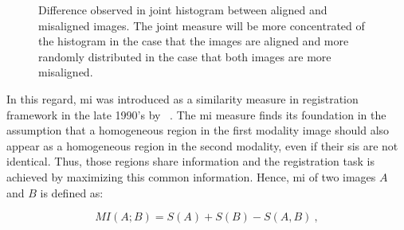 \begin{enumerate}[leftmargin=*]
\begin{figure}
  \centering
  \hspace*{\fill}
  \hfill
  \hspace*{\fill}
  \caption[Difference observed in joint histogram between aligned and
  misaligned images.]{Difference observed in joint histogram between aligned
    and misaligned images. The joint measure will be more concentrated of the
    histogram in the case that the images are aligned and more randomly
    distributed in the case that both images are more misaligned.}
  \label{fig:jointhisto}
\end{figure}

In this regard, \ac{mi} was introduced as a similarity measure in registration
framework in the late 1990's by \citeauthor{Pluim2003}~\cite{Pluim2003}.
The \ac{mi} measure finds its foundation in the assumption that a homogeneous
region in the first modality image should also appear as a homogeneous region
in the second modality, even if their \acp{si} are not identical.
Thus, those regions share information and the registration task is achieved by
maximizing this common information.
Hence, \Ac{mi} of two images $A$ and $B$ is defined as:

\begin{equation}
  MI(A;B) = S(A) + S(B) - S(A,B) \ ,
  \label{eq:midef}
\end{equation}


\end{enumerate}
